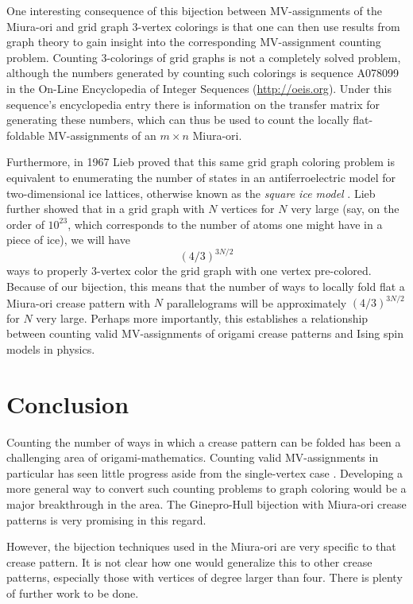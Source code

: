\documentclass{amsart}
\theoremstyle{definition}
\begin{document}
One interesting consequence of this bijection between MV-assignments of the Miura-ori and grid graph 3-vertex colorings is that one can then use results from graph theory to gain insight into the corresponding MV-assignment counting problem.  Counting 3-colorings of grid graphs is not a completely solved problem, although the numbers generated by counting such colorings is sequence A078099 in the On-Line Encyclopedia of Integer Sequences (\url{http://oeis.org}).  Under this sequence's encyclopedia entry there is information on the transfer matrix for generating these numbers, which can thus be used to count the locally flat-foldable MV-assignments of an $m\times n$ Miura-ori.

Furthermore, in 1967 Lieb proved that this same grid graph coloring problem is equivalent to enumerating the number of states in an antiferroelectric model for two-dimensional ice lattices, otherwise known as the {\em square ice model} \cite{Lieb}.  Lieb further showed that in a grid graph with $N$ vertices for $N$ very large (say, on the order of $10^{23}$, which corresponds to the number of atoms one might have in a piece of ice), we will have 
$$(4/3)^{3N/2}$$
ways to properly 3-vertex color the grid graph with one vertex pre-colored.  Because of our bijection, this means that the number of ways to locally fold flat a Miura-ori crease pattern with $N$ parallelograms will be approximately $(4/3)^{3N/2}$ for $N$ very large.  Perhaps more importantly, this establishes a relationship between counting valid MV-assignments of origami crease patterns and Ising spin models in physics.

\section{Conclusion}



Counting the number of ways in which a crease pattern can be folded has been a challenging area of origami-mathematics.  Counting valid MV-assignments in particular has seen little progress aside from the single-vertex case \cite{Hull3}.  Developing a more general way to convert such counting problems to graph coloring would be a major breakthrough in the area.  The Ginepro-Hull bijection with Miura-ori crease patterns is very promising in this regard.

However, the bijection techniques used in the Miura-ori are very specific to that crease pattern.  It is not clear how one would generalize this to other crease patterns, especially those with vertices of degree larger than four.  There is plenty of further work to be done.
\end{document}
